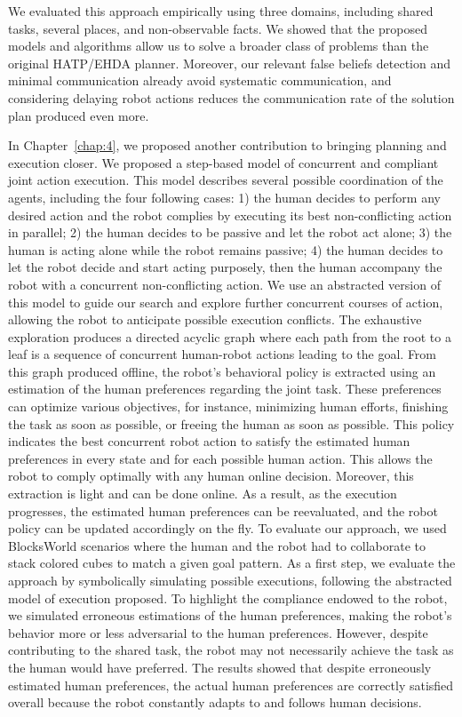 We evaluated this approach empirically using three domains, including shared tasks, several places, and non-observable facts. We showed that the proposed models and algorithms allow us to solve a broader class of problems than the original HATP/EHDA planner. Moreover, our relevant false beliefs detection and minimal communication already avoid systematic communication, and considering delaying robot actions reduces the communication rate of the solution plan produced even more. 


In Chapter~\ref{chap:4}, we proposed another contribution to bringing planning and execution closer. We proposed a step-based model of concurrent and compliant joint action execution. 
This model describes several possible coordination of the agents, including the four following cases: 1) the human decides to perform any desired action and the robot complies by executing its best non-conflicting action in parallel; 2) the human decides to be passive and let the robot act alone; 3) the human is acting alone while the robot remains passive; 4) the human decides to let the robot decide and start acting purposely, then the human accompany the robot with a concurrent non-conflicting action.
We use an abstracted version of this model to guide our search and explore further concurrent courses of action, allowing the robot to anticipate possible execution conflicts. 
The exhaustive exploration produces a directed acyclic graph where each path from the root to a leaf is a sequence of concurrent human-robot actions leading to the goal. From this graph produced offline, the robot's behavioral policy is extracted using an estimation of the human preferences regarding the joint task. These preferences can optimize various objectives, for instance, minimizing human efforts, finishing the task as soon as possible, or freeing the human as soon as possible.  
This policy indicates the best concurrent robot action to satisfy the estimated human preferences in every state and for each possible human action. This allows the robot to comply optimally with any human online decision.  
Moreover, this extraction is light and can be done online. As a result, as the execution progresses, the estimated human preferences can be reevaluated, and the robot policy can be updated accordingly on the fly.
To evaluate our approach, we used BlocksWorld scenarios where the human and the robot had to collaborate to stack colored cubes to match a given goal pattern. 
As a first step, we evaluate the approach by symbolically simulating possible executions, following the abstracted model of execution proposed. To highlight the compliance endowed to the robot, we simulated erroneous estimations of the human preferences, making the robot's behavior more or less adversarial to the human preferences. However, despite contributing to the shared task, the robot may not necessarily achieve the task as the human would have preferred. The results showed that despite erroneously estimated human preferences, the actual human preferences are correctly satisfied overall because the robot constantly adapts to and follows human decisions. 


